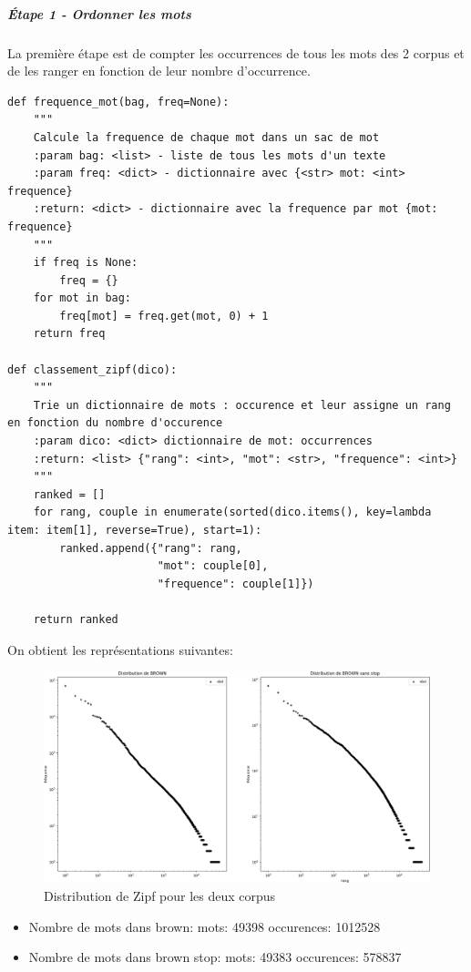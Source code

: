 \documentclass[a4paper,12pt]{article}
\begin{document}
		\subparagraph{Étape 1 - Ordonner les mots}
			La première étape est de compter les occurrences de tous les mots des 2 corpus et de les ranger en fonction de leur nombre d’occurrence. 
			\begin{lstlisting}[title=Triage des mots]
def frequence_mot(bag, freq=None):
    """
    Calcule la frequence de chaque mot dans un sac de mot
    :param bag: <list> - liste de tous les mots d'un texte
    :param freq: <dict> - dictionnaire avec {<str> mot: <int> frequence}
    :return: <dict> - dictionnaire avec la frequence par mot {mot: frequence}
    """
    if freq is None:
        freq = {}
    for mot in bag:
        freq[mot] = freq.get(mot, 0) + 1
    return freq
		
def classement_zipf(dico):
    """
    Trie un dictionnaire de mots : occurence et leur assigne un rang en fonction du nombre d'occurence
    :param dico: <dict> dictionnaire de mot: occurrences
    :return: <list> {"rang": <int>, "mot": <str>, "frequence": <int>}
    """
    ranked = []
    for rang, couple in enumerate(sorted(dico.items(), key=lambda item: item[1], reverse=True), start=1):
        ranked.append({"rang": rang,
                       "mot": couple[0],
                       "frequence": couple[1]})

    return ranked \end{lstlisting}
    
    		
    		On obtient les représentations suivantes: 
		\begin{figure}[H]
				\includegraphics[width=\linewidth]{img/distribZipf.png}
				\caption{Distribution de Zipf pour les deux corpus}
		\end{figure}    		
    		
    		\begin{itemize}
    			\item Nombre de mots dans brown:	mots: 49398	occurences: 1012528
    			\item Nombre de mots dans brown stop:	mots: 49383	occurences: 578837\\
    		\end{itemize}
    		
\end{document}
